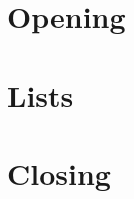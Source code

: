 \documentclass[aspectratio=169]{beamer}
\begin{document}
\section{Opening}
\gdef\studiocataloguename{\detokenize{contents-five}}
\gdef\studiocataloguename{\detokenize{team-presentation}}
\section{Lists}
\gdef\studiocataloguename{\detokenize{list-rail-five}}
\section{Closing}
\gdef\studiocataloguename{\detokenize{closing}}
\end{document}
